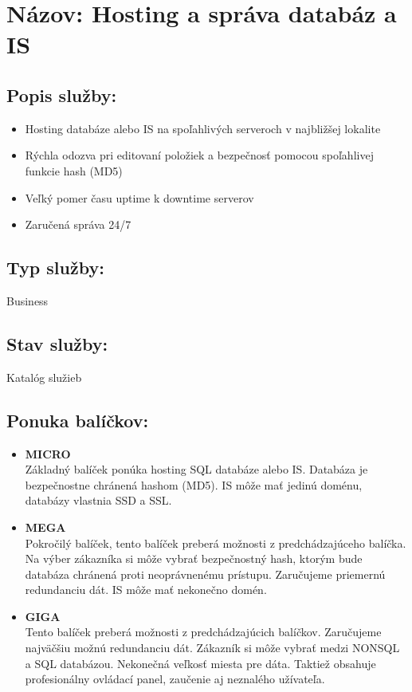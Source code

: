 \documentclass[a4paper, 11pt]{article}
\begin{document}
\section*{Názov: Hosting a správa databáz a IS}
\subsection*{Popis služby:}
\begin{itemize}
\item Hosting databáze alebo IS na spoľahlivých serveroch v najbližšej lokalite
\item Rýchla odozva pri editovaní položiek a bezpečnosť pomocou spoľahlivej funkcie hash (MD5)
\item Veľký pomer času uptime k downtime serverov
\item Zaručená správa 24/7
\end{itemize}
\subsection*{Typ služby:}
Business
\subsection*{Stav služby:}
Katalóg služieb
\subsection*{Ponuka balíčkov:}
\begin{itemize}
\item \textbf{MICRO}\\
Základný balíček ponúka hosting SQL databáze alebo IS. Databáza je bezpečnostne chránená hashom (MD5). IS môže mať jedinú doménu, databázy vlastnia SSD a SSL.
\item \textbf{MEGA}\\
Pokročilý balíček, tento balíček preberá možnosti z predchádzajúceho balíčka. Na výber zákazníka si môže vybrať bezpečnostný hash, ktorým bude databáza chránená proti neoprávnenému prístupu. Zaručujeme priemernú redundanciu dát. IS môže mať nekonečno domén.
\item \textbf{GIGA}\\
Tento balíček preberá možnosti z predchádzajúcich balíčkov. Zaručujeme najväčšiu možnú redundanciu dát. Zákazník si môže vybrať medzi NONSQL a SQL databázou. Nekonečná veľkosť miesta pre dáta. Taktiež obsahuje profesionálny ovládací panel, zaučenie aj neznalého užívateľa.
\end{itemize}
\end{document}
